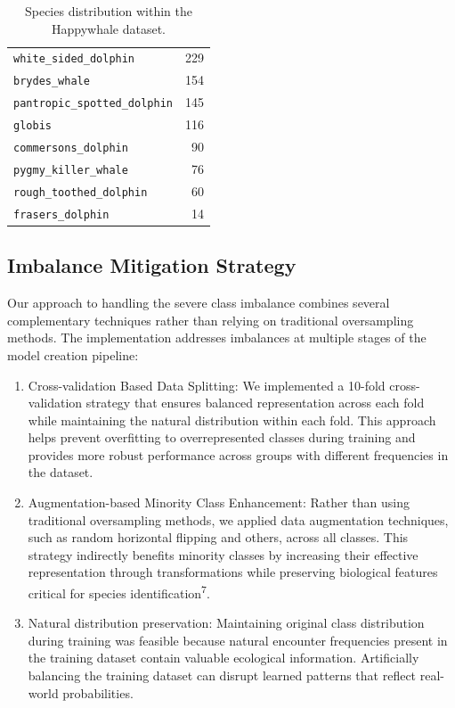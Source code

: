 \documentclass[twocolumn]{article}
\begin{document}
\begin{table}[ht]
\begin{tabular}{l r}
\texttt{white\_sided\_dolphin}         &   229 \\
\texttt{brydes\_whale}                 &   154 \\
\texttt{pantropic\_spotted\_dolphin}   &   145 \\
\texttt{globis}                        &   116 \\
\texttt{commersons\_dolphin}           &    90 \\
\texttt{pygmy\_killer\_whale}          &    76 \\
\texttt{rough\_toothed\_dolphin}       &    60 \\
\texttt{frasers\_dolphin}&    14 \\
\hline
\end{tabular}
\caption{Species distribution within the Happywhale dataset.}
\label{tab:species_counts}
\end{table}

\subsection{Imbalance Mitigation Strategy}

Our approach to handling the severe class imbalance combines several complementary techniques rather than relying on traditional oversampling methods. The implementation addresses imbalances at multiple stages of the model creation pipeline:
\begin{enumerate}
\item Cross-validation Based Data Splitting: We implemented a 10-fold cross-validation strategy that ensures balanced representation across each fold while maintaining the natural distribution within each fold. This approach helps prevent overfitting to overrepresented classes during training and provides more robust performance across groups with different frequencies in the dataset. 
\item Augmentation-based Minority Class Enhancement: Rather than using traditional oversampling methods, we applied data augmentation techniques, such as random horizontal flipping and others, across all classes. This strategy indirectly benefits minority classes by increasing their effective representation through transformations while preserving biological features critical for species identification\textsuperscript{7}.
\item Natural distribution preservation: Maintaining original class distribution during training was feasible because natural encounter frequencies present in the training dataset contain valuable ecological information. Artificially balancing the training dataset can disrupt learned patterns that reflect real-world probabilities. 
\end{enumerate}
\end{document}
